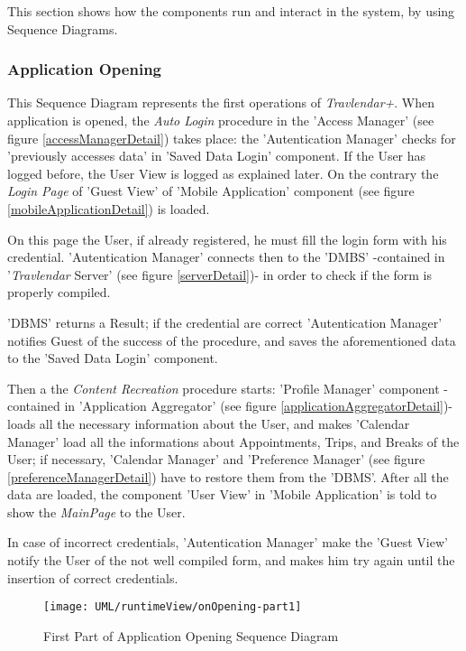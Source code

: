 This section shows how the components run and interact in the system, by using Sequence Diagrams.

\subsubsection{Application Opening}

	This Sequence Diagram represents the first operations of \textit{Travlendar+}.
	When application is opened, the \textsl{Auto Login} procedure in the 'Access Manager' (see figure \ref{accessManagerDetail}) takes place: the 'Autentication Manager' checks for 'previously accesses data' in 'Saved Data Login' component. If the User has logged before, the User View is logged as explained later.
	On the contrary the \textsl{Login Page} of 'Guest View' of 'Mobile Application' component  (see figure \ref{mobileApplicationDetail}) is loaded.
	
	On this page the User, if already registered, he must fill the login form with his credential.
	'Autentication Manager' connects then to the 'DMBS' -contained in '\textit{Travlendar} Server' (see figure \ref{serverDetail})- in order to check if the form is properly compiled.
	
	'DBMS' returns a Result; if the credential are correct 'Autentication Manager' notifies Guest of the success of the procedure, and saves the aforementioned data to the 'Saved Data Login' component.
	
	Then a the \textsl{Content Recreation} procedure starts:
	'Profile Manager' component -contained in 'Application Aggregator' (see figure \ref{applicationAggregatorDetail})- loads all the necessary information about the User, and makes 'Calendar Manager' load all the informations about Appointments, Trips, and Breaks of the User; if necessary, 'Calendar Manager' and 'Preference Manager' (see figure \ref{preferenceManagerDetail}) have to restore them from the 'DBMS'.
	After all the data are loaded, the component 'User View' in 'Mobile Application' is told to show the \textsl{MainPage} to the User.
	
	In case of incorrect credentials, 'Autentication Manager' make the 'Guest View' notify the User of the not well compiled form, and makes him try again until the insertion of correct credentials.
	
	\begin{figure}[H]
		\centering
		\texttt{[image: UML/runtimeView/onOpening-part1]}
		\caption{First Part of Application Opening Sequence Diagram}
	\end{figure}
	
